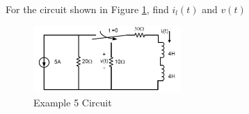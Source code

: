 \documentclass{handout}
\begin{document}
For the circuit shown in Figure \ref{fig: Example5}, find $i_l(t)$ and $v(t)$
\begin{figure} [h!]
\centering
\includegraphics[width=0.5\textwidth]{Example5.jpg}
\caption{Example 5 Circuit}
\label{fig: Example5}
\end{figure}
\newpage
\clearpage
\pagebreak
\end{document}
